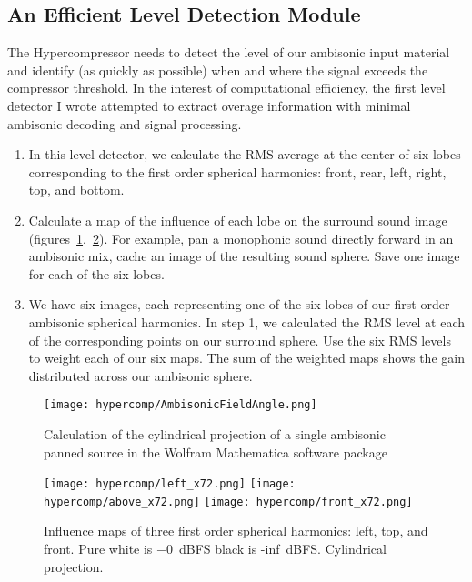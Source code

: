 \subsection{An Efficient Level Detection Module}
\label{sec:hyperc-level-detect}
The Hypercompressor needs to detect the level of our ambisonic input
material and identify (as quickly as possible) when and where the
signal exceeds the compressor threshold. In the interest of
computational efficiency, the first level detector I wrote attempted
to extract overage information with minimal ambisonic decoding and
signal processing.
\begin{enumerate}
\item In this level detector, we calculate the RMS average at the
  center of six lobes corresponding to the first order spherical
  harmonics: front, rear, left, right, top, and bottom.
\item Calculate a map of the influence of each lobe on the surround
  sound image
  (figures~\ref{fig:hypercomp-mathematica},~\ref{fig:hypercomp-inf-maps}). For
  example, pan a monophonic sound directly forward in an ambisonic
  mix, cache an image of the resulting sound sphere. Save one image
  for each of the six lobes.
\item We have six images, each representing one of the six lobes of our
  first order ambisonic spherical harmonics. In step 1, we calculated
  the RMS level at each of the corresponding points on our surround
  sphere. Use the six RMS levels to weight each of our six maps. The sum
  of the weighted maps shows the gain distributed across our ambisonic
  sphere.
\end{enumerate}

\begin{figure}[]
  \texttt{[image: hypercomp/AmbisonicFieldAngle.png]}
  \caption{Calculation of the cylindrical projection of a single ambisonic panned
    source in the Wolfram Mathematica software package}
  \label{fig:hypercomp-mathematica}
\end{figure}

\begin{figure}[]
 \texttt{[image: hypercomp/left\_x72.png]}
 \texttt{[image: hypercomp/above\_x72.png]}
 \texttt{[image: hypercomp/front\_x72.png]}
  \caption{Influence maps of three first order spherical harmonics: left, top, and
    front. Pure white is $-0$~dBFS black is -inf~dBFS. Cylindrical projection.}
  \label{fig:hypercomp-inf-maps}
\end{figure}

